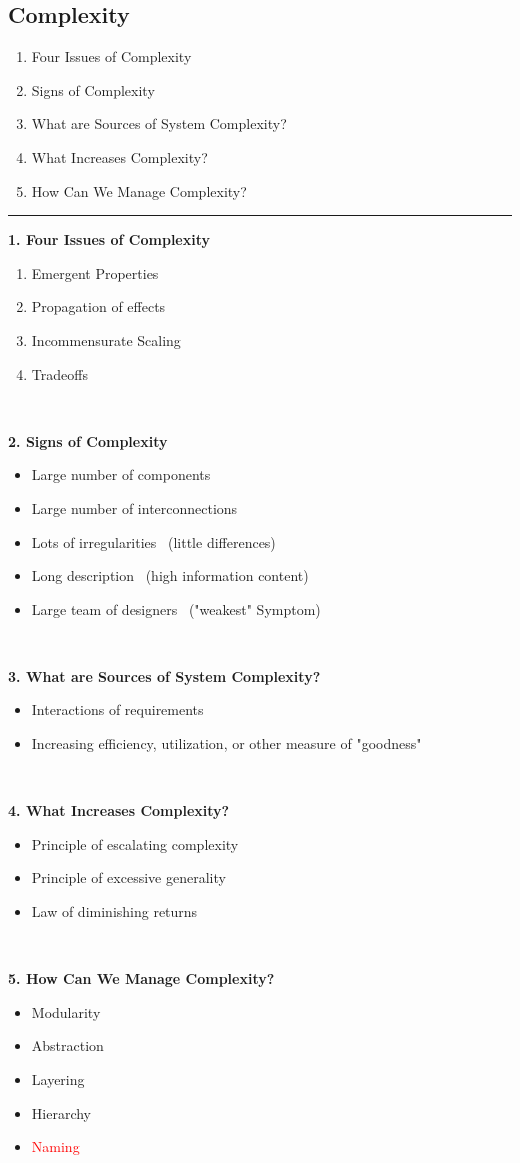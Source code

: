 \documentclass{article}
\begin{document}
\subsection*{Complexity}
\begin{enumerate}
    \item Four Issues of Complexity
    \item Signs of Complexity
    \item What are Sources of System Complexity?
    \item What Increases Complexity?
    \item How Can We Manage Complexity?
\end{enumerate}
\begin{center}
	\rule{450pt}{1pt} 
\end{center}

\noindent\large{\textbf{1. Four Issues of Complexity}}
\begin{enumerate}
    \item Emergent Properties
    \item Propagation of effects
    \item Incommensurate Scaling
    \item Tradeoffs
\end{enumerate}

\

\noindent\large{\textbf{2. Signs of Complexity}}
\begin{itemize}
    \item Large number of components
    \item Large number of interconnections
    \item Lots of irregularities \ (little differences)
    \item Long description \ (high information content)
    \item Large team of designers \ ("weakest" Symptom)
\end{itemize}

\

\noindent\large{\textbf{3. What are Sources of System Complexity?}}
\begin{itemize}
    \item Interactions of requirements
    \item Increasing efficiency, utilization, or other measure of "goodness"
\end{itemize}

\

\noindent\large{\textbf{4. What Increases Complexity?}}
\begin{itemize}
    \item Principle of escalating complexity
    \item Principle of excessive generality
    \item Law of diminishing returns
\end{itemize}

\

\noindent\large{\textbf{5. How Can We Manage Complexity?}}
\begin{itemize}
    \item Modularity
    \item Abstraction
    \item Layering
    \item Hierarchy
    \item \textcolor{red}{Naming}
\end{itemize}
\newpage
\end{document}
